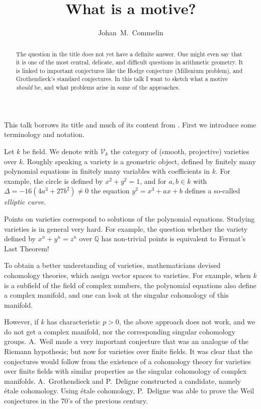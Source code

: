 \documentclass[a4paper,10pt]{article}
\title{What is a motive?}
\author{Johan~M.~Commelin}
\begin{document}
\maketitle

\begin{abstract} %
	The question in the title does not yet have a definite answer. One
	might even say that it is one of the most central, delicate, and
	difficult questions in arithmetic geometry. It is linked to important
	conjectures like the Hodge conjecture (Millenium problem), and
	Grothendieck's standard conjectures. In this talk I want to sketch what
	a motive \emph{should} be, and what problems arise in some of the
	approaches.
\end{abstract} %

This talk borrows its title and much of its content from \cite{mazur,milne}.
First we introduce some terminology and notation.

Let $k$ be field. We denote with $\mathcal{V}_{k}$ the category of (smooth,
projective) varieties over $k$. Roughly speaking a variety is a geometric
object, defined by finitely many polynomial equations in finitely many
variables with coefficients in $k$. For example, the circle is defined by
$x^{2} + y^{2} = 1$, and for $a,b \in k$ with $\Delta = -16(4a^{3} + 27b^{2})
\ne 0$ the equation $y^{2} = x^{3} + ax + b$ defines a so-called \emph{elliptic
curve}.

Points on varieties correspond to solutions of the polynomial equations.
Studying varieties is in general very hard. For example, the question whether
the variety defined by $x^{n} + y^{n} = z^{n}$ over $\mathbb{Q}$ has
non-trivial points is equivalent to Fermat's Last Theorem!

To obtain a better understanding of varieties, mathematicians devised
cohomology theories, which assign vector spaces to varieties. For example, when
$k$ is a subfield of the field of complex numbers, the polynomial equations
also define a complex manifold, and one can look at the singular cohomology of
this manifold.

However, if $k$ has characteristic $p > 0$, the above approach does not work,
and we do not get a complex manifold, nor the corresponding singular cohomology
groups. A.~Weil made a very important conjecture that was an analogue of the
Riemann hypothesis; but now for varieties over finite fields. It was clear that
the conjectures would follow from the existence of a cohomology theory for
varieties over finite fields with similar properties as the singular cohomology
of complex manifolds. A.~Grothendieck and P.~Deligne constructed a candidate,
namely \'{e}tale cohomology. Using \'{e}tale cohomology, P.~Deligne was able to
prove the Weil conjectures in the 70's of the previous century.
\end{document}
